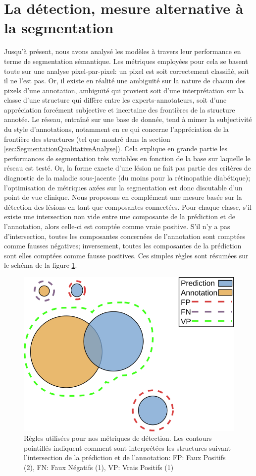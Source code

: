 \section{La détection, mesure alternative à la segmentation}
\label{sec:AnnexeDetectionLesions}
Jusqu'à présent, nous avons analysé les modèles à travers leur performance en terme de segmentation sémantique. Les métriques employées pour cela se basent toute sur une analyse pixel-par-pixel: un pixel est soit correctement classifié, soit il ne l'est pas. Or, il existe en réalité une ambiguïté sur la nature de chacun des pixels d'une annotation, ambiguïté qui provient soit d'une interprétation sur la classe d'une structure qui diffère entre les experts-annotateurs, soit d'une appréciation forcément subjective et incertaine des frontières de la structure annotée. Le réseau, entraîné sur une base de donnée, tend à mimer la subjectivité du style d'annotations, notamment en ce qui concerne l'appréciation de la frontière des structures (tel que montré dans la section \ref{sec:SegmentationQualitativeAnalyse}). Cela explique en grande partie les performances de segmentation très variables en fonction de la base sur laquelle le réseau est testé. Or, la forme exacte d'une lésion ne fait pas partie des critères de diagnostic de la maladie sous-jacente (du moins pour la rétinopathie diabétique); l'optimisation de métriques axées sur la segmentation est donc discutable d'un point de vue clinique. Nous proposons en complément une mesure basée sur la détection des lésions en tant que composantes connectées. Pour chaque classe, s'il existe une intersection non vide entre une composante de la prédiction et de l'annotation, alors celle-ci est comptée comme vraie positive. S'il n'y a pas d'intersection, toutes les composantes concernées de l'annotation sont comptées comme fausses négatives; inversement, toutes les composantes de la prédiction sont elles comptées comme fausse positives. 
Ces simples règles sont résumées sur le schéma de la figure \ref{fig:mesuredetection}.
\begin{figure}[H]
	\centering
	\includegraphics[width=0.5\linewidth]{gnuplot/segmentation_lesions/detection/mesureDetection}
	\caption{Règles utilisées pour nos métriques de détection. Les contours pointillés indiquent comment sont interprétées les structures suivant l'intersection de la prédiction et de l'annotation: FP: Faux Positifs (2), FN: Faux Négatifs (1), VP: Vrais Positifs (1)}
	\label{fig:mesuredetection}
\end{figure}
